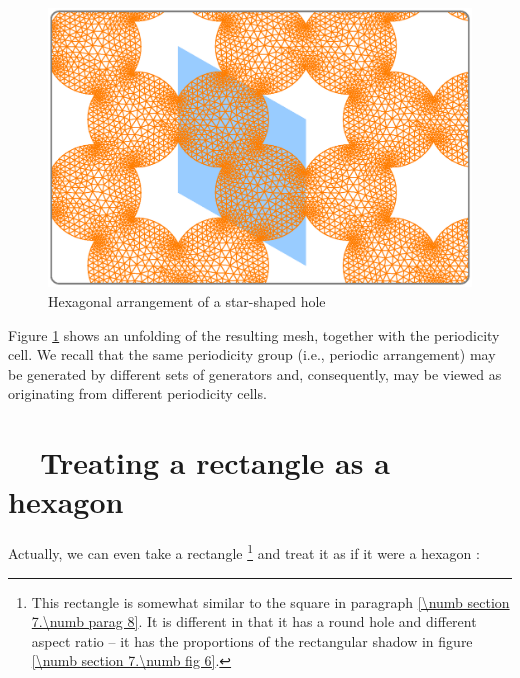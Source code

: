 \begin{figure}[ht] \centering
  \includegraphics[width=135mm]{repeated-balls.eps}
  \caption{Hexagonal arrangement of a star-shaped hole}
  \label{\numb section 7.\numb fig 17}
\end{figure}

Figure \ref{\numb section 7.\numb fig 17} shows an unfolding of the resulting mesh,
together with the periodicity cell.
We recall that the same periodicity group (i.e., periodic arrangement) may be generated
by different sets of generators and, consequently, may be viewed as originating
from different periodicity cells.


\section{~~Treating a rectangle as a hexagon}\label{\numb section 7.\numb parag 22}

Actually, we can even take a rectangle%
\footnote {{} This rectangle is somewhat similar to the square in paragraph
\ref{\numb section 7.\numb parag 8}.
It is different in that it has a round hole and different aspect ratio --
it has the proportions of the rectangular shadow in figure \ref{\numb section 7.\numb fig 6}.}
and treat it as if it were a hexagon :
\vskip 3mm

